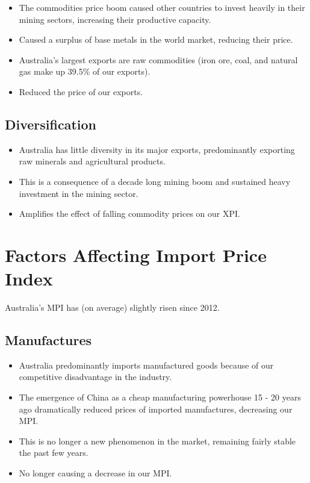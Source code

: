 \documentclass[a4paper,11pt]{report}
\begin{document}
\begin{itemize}
\item The commodities price boom caused other countries to invest heavily in
	their mining sectors, increasing their productive capacity.
\item Caused a surplus of base metals in the world market, reducing their
	price.
\item Australia's largest exports are raw commodities (iron ore, coal, and
	natural gas make up 39.5\% of our exports).
\item Reduced the price of our exports.
\end{itemize}

\subsection{Diversification}

\begin{itemize}
\item Australia has little diversity in its major exports, predominantly
	exporting raw minerals and agricultural products.
\item This is a consequence of a decade long mining boom and sustained heavy
	investment in the mining sector.
\item Amplifies the effect of falling commodity prices on our XPI.
\end{itemize}


\section{Factors Affecting Import Price Index}

Australia's MPI has (on average) slightly risen since 2012.

\subsection{Manufactures}

\begin{itemize}
\item Australia predominantly imports manufactured goods because of our
	competitive disadvantage in the industry.
\item The emergence of China as a cheap manufacturing powerhouse 15 - 20 years
	ago dramatically reduced prices of imported manufactures, decreasing our
	MPI.
\item This is no longer a new phenomenon in the market, remaining fairly stable
	the past few years.
\item No longer causing a decrease in our MPI.
\end{itemize}
\end{document}
